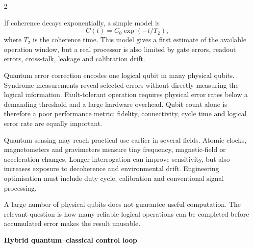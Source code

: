 \begin{multicols}{2}
\begin{ecarticle}
If coherence decays exponentially, a simple model is
\[
C(t)=C_0\exp(-t/T_2),
\]
where $T_2$ is the coherence time. This model gives a first estimate of the available operation window, but a real
processor is also limited by gate errors, readout errors, cross-talk, leakage and calibration drift.

Quantum error correction encodes one logical qubit in many physical qubits. Syndrome measurements reveal selected
errors without directly measuring the logical information. Fault-tolerant operation requires physical error rates
below a demanding threshold and a large hardware overhead. Qubit count alone is therefore a poor performance metric;
fidelity, connectivity, cycle time and logical error rate are equally important.

Quantum sensing may reach practical use earlier in several fields. Atomic clocks, magnetometers and gravimeters
measure tiny frequency, magnetic-field or acceleration changes. Longer interrogation can improve sensitivity, but
also increases exposure to decoherence and environmental drift. Engineering optimisation must include duty cycle,
calibration and conventional signal processing.
\end{ecarticle}

\begin{tcolorbox}[title=\sffamily\bfseries Engineering insight,colback=yellow!10,colframe=ECOrange]
A large number of physical qubits does not guarantee useful computation. The relevant question is how many reliable
logical operations can be completed before accumulated error makes the result unusable.
\end{tcolorbox}

\begin{engineeringfocus}
\textbf{Hybrid quantum--classical control loop}
\begin{center}
\end{center}
\end{engineeringfocus}


\end{multicols}
